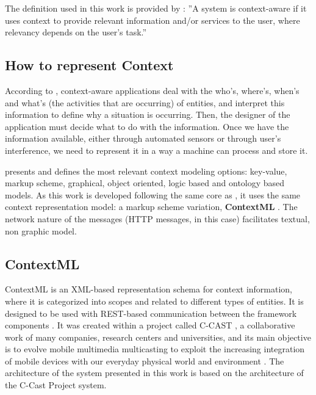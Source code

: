 The definition used in this work is provided by \cite{dey2000providing}: ''A system is context-aware if it uses context to provide relevant information and/or services to the user, where relevancy depends on the user's task.''


\subsection{How to represent Context}
According to \cite{dey2000providing}, context-aware applications deal with the who's, where's, when's and what's (the activities that are occurring) of entities, and interpret this information to define why a situation is occurring. Then, the designer of the application must decide what to do with the information. Once we have the information available, either through automated sensors or through user's interference, we need to represent it in a way a machine can process and store it.

\cite{baldauf2007survey} presents and defines the most relevant context modeling options: key-value, markup scheme, graphical, object oriented, logic based and ontology based models. As this work is developed following the same core as \cite{crippa2010}, it uses the same context representation model: a markup scheme variation, \textbf{ContextML} \cite{knappmeyer2010contextml}. The network nature of the messages (HTTP messages, in this case) facilitates textual, non graphic model. 

\subsection{ContextML}

ContextML is an XML-based representation schema for context information, where it is categorized into scopes and related to different types of entities. It is designed to be used with REST-based communication between the framework components \cite{knappmeyer2010contextml}. It was created within a project called C-CAST \cite{ccast}, a collaborative work of many companies, research centers and universities, and its main objective is to evolve mobile multimedia multicasting to exploit the increasing integration of mobile devices with our everyday physical world and environment \cite{crippa2010}. The architecture of the system presented in this work is based on the architecture of the C-Cast Project system.

